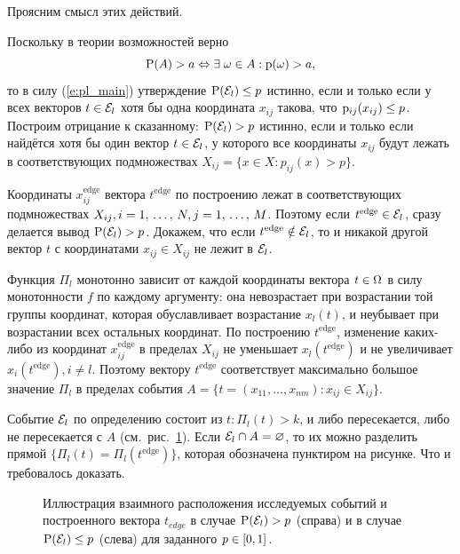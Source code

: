 Проясним смысл этих действий. 

Поскольку в теории возможностей верно
\begin{equation*}
  {\mathrm{P}}(A) > a \Leftrightarrow \exists\; \omega \in A: {\mathrm{p}}(\omega) > a,
\end{equation*}
то в силу (\ref{e:pl_main}) утверждение ${\mathrm{P}}(\mathcal{E}_l) \leq p$ истинно, если и только если у всех векторов $t \in \mathcal{E}_l$ хотя бы одна координата $x_{ij}$ такова, что ${\mathrm{p}}_{ij}(x_{ij}) \leq p$. Построим отрицание к сказанному: ${\mathrm{P}}(\mathcal{E}_l) > p$ истинно, если и только если найдётся хотя бы один вектор $t \in \mathcal{E}_l$, у которого все координаты $x_{ij} $ будут лежать в соответствующих подмножествах $X_{ij} = \{x \in X: p_{ij}(x) > p\}$.

Координаты $x_{ij}^\text{edge}$ вектора $t^\text{edge}$ по построению лежат в соответствующих подмножествах $X_{ij}, i = 1,\, \ldots,\, N, j = 1,\, \ldots,\, M$. Поэтому если $t^\text{edge} \in \mathcal{E}_l$, сразу делается вывод ${\mathrm{P}}(\mathcal{E}_l) > p$. Докажем, что если $t^\text{edge} \notin \mathcal{E}_l$, то и никакой другой вектор $t$ с координатами $x_{ij} \in X_{ij}$ не лежит в $\mathcal{E}_l$. 

Функция $\Pi_l$ монотонно зависит от каждой координаты вектора $t \in \Omega$ в силу монотонности $f$ по каждому аргументу: она невозрастает при возрастании той группы координат, которая обуславливает возрастание $x_l(t)$, и неубывает при возрастании всех остальных координат. По построению $t^\text{edge}$, изменение каких-либо из координат $x_{ij}^\text{edge}$ в пределах $X_{ij}$ не уменьшает $x_l(t^\text{edge})$ и не увеличивает $x_i(t^\text{edge}), i \neq l$. Поэтому вектору $t^\text{edge}$ соответствует максимально большое значение $\Pi_l$ в пределах события $A = \{t = (x_{11}, ..., x_{nm}): x_{ij} \in X_{ij}\}$.

Событие $\mathcal{E}_l$ по определению состоит из $t: \Pi_l(t) > k$, и либо пересекается, либо не пересекается с $A$ (см.~рис.~\ref{ris:algo_sets}). Если $\mathcal{E}_l \cap A = \varnothing$, то их можно разделить прямой $\{\Pi_l(t) = \Pi_l(t^\text{edge})\}$, которая обозначена пунктиром на рисунке. Что и требовалось доказать.

\begin{figure}[h]
\caption{\small Иллюстрация взаимного расположения исследуемых событий и построенного вектора $t_{edge}$ в случае ${\mathrm{P}}(\mathcal{E}_l) > p$ (справа) и в случае ${\mathrm{P}}(\mathcal{E}_l) \leq p$ (слева) для заданного $p \in [0,1]$.}
\label{ris:algo_sets}
\end{figure}



